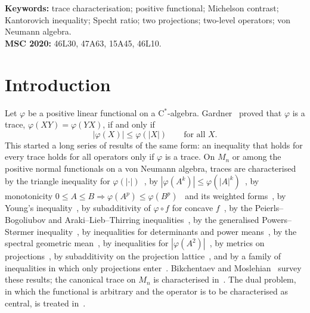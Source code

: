 \documentclass[11pt]{article}
\theoremstyle{plain}
\theoremstyle{definition}
\theoremstyle{remark}
\begin{document}
\noindent\textbf{Keywords:} trace characterisation; positive functional; Michelson contrast; Kantorovich inequality;
Specht ratio; two projections; two-level operators; von Neumann algebra.\\
\textbf{MSC 2020:} 46L30, 47A63, 15A45, 46L10.

\section{Introduction}\label{sec:intro}

Let $\varphi$ be a positive linear functional on a C$^*$-algebra. Gardner~\cite{gardner1979} proved that $\varphi$ is
a trace, $\varphi(XY)=\varphi(YX)$, if and only if
\begin{equation}\label{eq:gardner}
  |\varphi(X)|\le\varphi(|X|)\qquad\text{for all }X .
\end{equation}
This started a long series of results of the same form: an inequality that holds for every trace holds for all
operators only if $\varphi$ is a trace. On $M_n$ or among the positive normal functionals on a von Neumann algebra,
traces are characterised by the triangle inequality for $\varphi(|\cdot|)$~\cite{gardner1979,stolyarov2002},
by $|\varphi(A^k)|\le\varphi(|A|^k)$~\cite{petz1988}, by monotonicity $0\le A\le B\Rightarrow\varphi(A^p)\le
\varphi(B^p)$~\cite{bikchentaev2007mono,sano2006} and its weighted forms~\cite{hoa2007,hoa2010}, by Young's
inequality~\cite{bikchentaev2005young,cho2009}, by subadditivity of $\varphi\circ f$ for concave
$f$~\cite{tikhonov2005}, by the Peierls--Bogoliubov and Araki--Lieb--Thirring inequalities~\cite{bikchentaev2011pb},
by the generalised Powers--St{\o}rmer inequality~\cite{hoa2013}, by inequalities for determinants and power
means~\cite{bikchentaev2020det}, by the spectral geometric mean~\cite{bikchentaev2026sgm}, by inequalities for
$|\varphi(A^2)|$~\cite{bikchentaev2026moslehian}, by metrics on projections~\cite{bikchentaev2019metric}, by
subadditivity on the projection lattice~\cite[Theorem~4]{petz1988}, and by a family of inequalities in which only
projections enter~\cite{bikchentaev2009rm,bikchentaev2010smj,bikchentaev2011mn,bikchentaev2019abed}. Bikchentaev and
Moslehian~\cite{bikchentaev2025survey} survey these results; the canonical trace on $M_n$ is characterised
in~\cite{moslehian2025jmaa,bikchentaev2020det}. The dual problem, in which the functional is arbitrary and the
operator is to be characterised as central, is treated in~\cite{novikov2015}.
\end{document}
